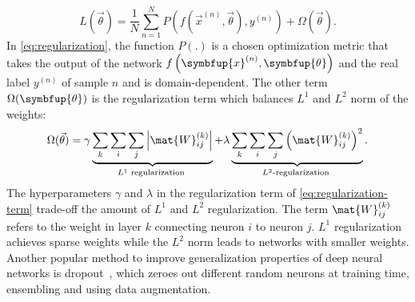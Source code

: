 \begin{equation}\label{eq:regularization}
	L(\vec{\theta})=\frac{1}{N} \sum_{n=1}^{N} P\left(f\left(\vec{x}^{(n)}, \vec{\theta}\right), y^{(n)}\right)+\Omega(\vec{\theta}).
\end{equation}
In \cref{eq:regularization}, the function $P(.)$ is a chosen optimization metric that takes the output of the network $f\left(\symbfup{x}^{(n)}, \symbfup{\theta}\right)$ and the real label $y^{(n)}$ of sample $n$ and is domain-dependent. The other term $\Omega(\symbfup{\theta})$ is the regularization term which balances $L^1$ and $L^2$ norm of the weights:
\begin{equation} \label{eq:regularization-term}
	\Omega(\vec{\theta})=\gamma \underbrace{\sum_{k} \sum_{i} \sum_{j}\left|\mat{W}_{i j}^{(k)}\right|}_{L^1 \text { regularization }}+\lambda \underbrace{\sum_{k} \sum_{i} \sum_{j}\left(\mat{W}_{i j}^{(k)}\right)^{2}}_{L^2 \text {-regularization }}.
\end{equation}
The hyperparameters $\gamma$ and $\lambda$ in the regularization term of \cref{eq:regularization-term} trade-off the amount of $L^1$ and $L^2$ regularization. The term $\mat{W}_{i j}^{(k)}$ refers to the weight in layer $k$ connecting neuron $i$ to neuron $j$. $L^1$ regularization achieves sparse weights while the $L^2$ norm leads to networks with smaller weights. Another popular method to improve generalization properties of deep neural networks is dropout~\autocite{dropout}, which zeroes out different random neurons at training time, ensembling and using data augmentation.

